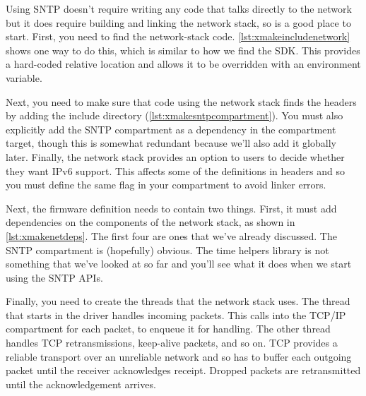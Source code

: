 Using SNTP doesn't require writing any code that talks directly to the network but it does require building and linking the network stack, so is a good place to start.
First, you need to find the network-stack code.
\ref{lst:xmakeincludenetwork} shows one way to do this, which is similar to how we find the SDK.
This provides a hard-coded relative location and allows it to be overridden with an environment variable.

\lualisting[filename=examples/sntp/xmake.lua,marker=include_network,label=lst:xmakeincludenetwork,caption="Build system code for including the network stack."]{}

Next, you need to make sure that code using the network stack finds the headers by adding the include directory (\ref{lst:xmakesntpcompartment}).
You must also explicitly add the SNTP compartment as a dependency in the compartment target, though this is somewhat redundant because we'll also add it globally later.
Finally, the network stack provides an option to users to decide whether they want IPv6 support.
This affects some of the definitions in headers and so you must define the same flag in your compartment to avoid linker errors.

\lualisting[filename=examples/sntp/xmake.lua,marker=sntp,label=lst:xmakesntpcompartment,caption="Build system code for building a compartment that uses the network stack."]{}

Next, the firmware definition needs to contain two things.
First, it must add dependencies on the components of the network stack, as shown in \ref{lst:xmakenetdeps}.
The first four are ones that we've already discussed.
The SNTP compartment is (hopefully) obvious.
The time helpers library is not something that we've looked at so far and you'll see what it does when we start using the SNTP APIs.

\lualisting[filename=examples/sntp/xmake.lua,marker=network_stack_deps,label=lst:xmakenetdeps,caption="Build system code for adding dependencies on the network stack."]{}

Finally, you need to create the threads that the network stack uses.
The thread that starts in the driver handles incoming packets.
This calls into the TCP/IP compartment for each packet, to enqueue it for handling.
The other thread handles TCP retransmissions, keep-alive packets, and so on.
TCP provides a reliable transport over an unreliable network and so has to buffer each outgoing packet until the receiver acknowledges receipt.
Dropped packets are retransmitted until the acknowledgement arrives.

